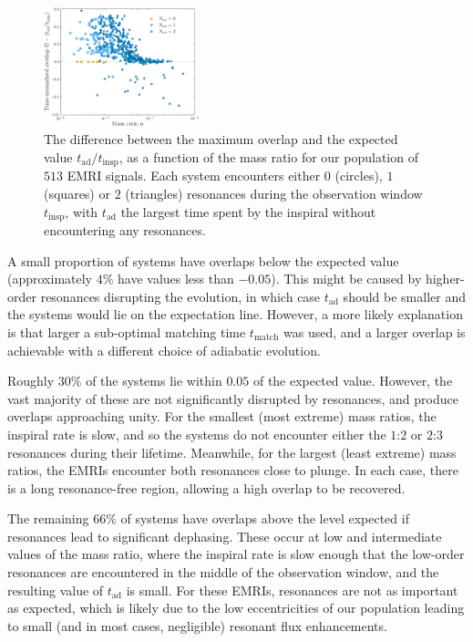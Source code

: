 \documentclass[aps,prd,amsfonts,amssymb,amsmath,nofootinbib,showpacs,superscriptaddress,twocolumn,floatfix]{revtex4-1}
\newcommand{\sub}[1]{\ensuremath{_\mathrm{#1}}}
\begin{document}
\begin{figure}
\centering
\includegraphics[width=0.4\textwidth]{Fig_res_overlap_t}
\caption{\label{fig:pop-adSNR-vs-eta}The difference between the maximum overlap and the expected value $t\sub{ad} / t\sub{insp}$, as a function of the mass ratio for our population of $513$ EMRI signals. Each system encounters either $0$ (circles), $1$ (squares) or $2$ (triangles) resonances during the observation window $t\sub{insp}$, with $t\sub{ad}$ the largest time spent by the inspiral without encountering any resonances.}
\end{figure}

A small proportion of systems have overlaps below the expected value (approximately $4\%$ have values less than $-0.05$). This might be caused by higher-order resonances disrupting the evolution, in which case $t\sub{ad}$ should be smaller and the systems would lie on the expectation line. However, a more likely explanation is that larger a sub-optimal matching time $t\sub{match}$ was used, and a larger overlap is achievable with a different choice of adiabatic evolution.

Roughly $30\%$ of the systems lie within $0.05$ of the expected value. However, the vast majority of these are not significantly disrupted by resonances, and produce overlaps approaching unity. For the smallest (most extreme) mass ratios, the inspiral rate is slow, and so the systems do not encounter either the $1$:$2$ or $2$:$3$ resonances during their lifetime. Meanwhile, for the largest (least extreme) mass ratios, the EMRIs encounter both resonances close to plunge. In each case, there is a long resonance-free region, allowing a high overlap to be recovered.

The remaining $66\%$ of systems have overlaps above the level expected if resonances lead to significant dephasing. These occur at low and intermediate values of the mass ratio, where the inspiral rate is slow enough that the low-order resonances are encountered in the middle of the observation window, and the resulting value of $t\sub{ad}$ is small. For these EMRIs, resonances are not as important as expected, which is likely due to the low eccentricities of our population leading to small (and in most cases, negligible) resonant flux enhancements.
\end{document}
